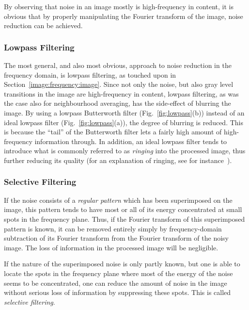 By observing that noise in an image mostly is high-frequency in
content, it is obvious that by properly manipulating the Fourier
transform of the image, noise reduction can be achieved.

\subsubsection{Lowpass Filtering}

The most general, and also most obvious, approach to noise reduction
in the frequency domain, is lowpass filtering, as touched upon in
Section~\ref{image:frequency:image}.  Since not only the noise, but
also gray level transitions in the image are high-frequency in
content, lowpass filtering, as was the case also for neighbourhood
averaging, has the side-effect of blurring the image.  By using a
lowpass Butterworth filter (Fig.~\ref{fig:lowpass}(b)) instead of an
ideal lowpass filter (Fig.~\ref{fig:lowpass}(a)), the degree of
blurring is reduced.  This is because the ``tail'' of the Butterworth
filter lets a fairly high amount of high-frequency information
through.  In addition, an ideal lowpass filter tends to introduce what
is commonly referred to as {\em ringing\/} into the processed image,
thus further reducing its quality (for an explanation of ringing, see
for instance~\cite{digim}).

\subsubsection{Selective Filtering}

If the noise consists of a {\em regular pattern\/} which has been
superimposed on the image, this pattern tends to have most or all of
its energy concentrated at small spots in the frequency plane.  Thus,
if the Fourier transform of this superimposed pattern is known, it can
be removed entirely simply by frequency-domain subtraction of its
Fourier transform from the Fourier transform of the noisy image.  The
loss of information in the processed image will be negligible.

If the nature of the superimposed noise is only partly known, but one
is able to locate the spots in the frequency plane where most of the
energy of the noise seems to be concentrated, one can reduce the
amount of noise in the image without serious loss of information by
suppressing these spots.  This is called {\em selective filtering\/}.
